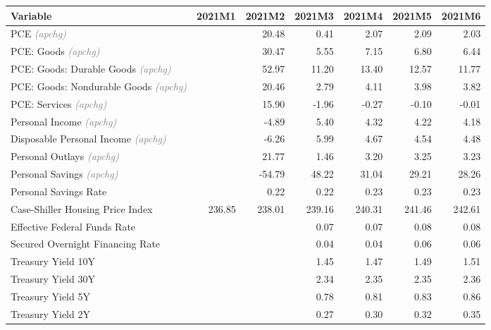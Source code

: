 \documentclass[11pt, letterpaper]{article}\usepackage[]{graphicx}\usepackage[]{color}
\begin{document}
\begin{table}[H]
\centering
\begingroup\fontsize{10pt}{12pt}\selectfont
\begin{tabular}{lrrrrrr}
  \hline
Variable & 2021M1 & 2021M2 & 2021M3 & 2021M4 & 2021M5 & 2021M6 \\ 
  \hline
PCE \textit{\footnotesize\textcolor{gray}{(apchg)}} &  & 20.48 & 0.41 & 2.07 & 2.09 & 2.03 \\ 
  PCE: Goods \textit{\footnotesize\textcolor{gray}{(apchg)}} &  & 30.47 & 5.55 & 7.15 & 6.80 & 6.44 \\ 
  PCE: Goods: Durable Goods \textit{\footnotesize\textcolor{gray}{(apchg)}} &  & 52.97 & 11.20 & 13.40 & 12.57 & 11.77 \\ 
  PCE: Goods: Nondurable Goods \textit{\footnotesize\textcolor{gray}{(apchg)}} &  & 20.46 & 2.79 & 4.11 & 3.98 & 3.82 \\ 
  PCE: Services \textit{\footnotesize\textcolor{gray}{(apchg)}} &  & 15.90 & -1.96 & -0.27 & -0.10 & -0.01 \\ 
  Personal Income \textit{\footnotesize\textcolor{gray}{(apchg)}} &  & -4.89 & 5.40 & 4.32 & 4.22 & 4.18 \\ 
  Disposable Personal Income \textit{\footnotesize\textcolor{gray}{(apchg)}} &  & -6.26 & 5.99 & 4.67 & 4.54 & 4.48 \\ 
  Personal Outlays \textit{\footnotesize\textcolor{gray}{(apchg)}} &  & 21.77 & 1.46 & 3.20 & 3.25 & 3.23 \\ 
  Personal Savings \textit{\footnotesize\textcolor{gray}{(apchg)}} &  & -54.79 & 48.22 & 31.04 & 29.21 & 28.26 \\ 
  Personal Savings Rate &  & 0.22 & 0.22 & 0.23 & 0.23 & 0.23 \\ 
  Case-Shiller Housing Price Index & 236.85 & 238.01 & 239.16 & 240.31 & 241.46 & 242.61 \\ 
  Effective Federal Funds Rate &  &  & 0.07 & 0.07 & 0.08 & 0.08 \\ 
  Secured Overnight Financing Rate &  &  & 0.04 & 0.04 & 0.06 & 0.06 \\ 
  Treasury Yield 10Y &  &  & 1.45 & 1.47 & 1.49 & 1.51 \\ 
  Treasury Yield 30Y &  &  & 2.34 & 2.35 & 2.35 & 2.36 \\ 
  Treasury Yield 5Y &  &  & 0.78 & 0.81 & 0.83 & 0.86 \\ 
  Treasury Yield 2Y &  &  & 0.27 & 0.30 & 0.32 & 0.35 \\ 

\end{tabular}
\end{table}
\end{document}
